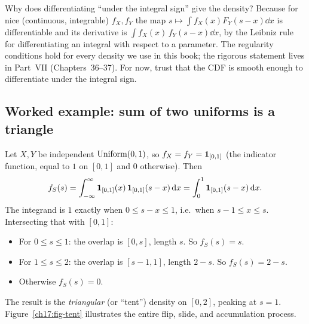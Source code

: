 \begin{whybox}
Why does differentiating ``under the integral sign'' give the density?
Because for nice (continuous, integrable) $f_X,f_Y$ the map
$s\mapsto \int f_X(x)F_Y(s-x)\dd x$ is differentiable and its derivative is
$\int f_X(x)\,f_Y(s-x)\dd x$, by the Leibniz rule for differentiating an
integral with respect to a parameter. The regularity conditions hold for
every density we use in this book; the rigorous statement lives in
Part~VII (Chapters~36--37). For now, trust that the CDF is smooth enough to
differentiate under the integral sign.
\end{whybox}

\subsection{Worked example: sum of two uniforms is a triangle}

Let $X,Y$ be independent $\operatorname{Uniform}(0,1)$, so $f_X=f_Y=\mathbf{1}_{[0,1]}$ (the indicator function, equal to $1$ on $[0,1]$ and $0$ otherwise). Then
\[
f_S(s) = \int_{-\infty}^{\infty} \mathbf{1}_{[0,1]}(x)\,\mathbf{1}_{[0,1]}(s-x)\,\mathrm{d} x
       = \int_0^1 \mathbf{1}_{[0,1]}(s-x)\,\mathrm{d} x.
\]
The integrand is $1$ exactly when $0\le s-x\le 1$, i.e.\ when
$s-1\le x\le s$. Intersecting that with $[0,1]$:
\begin{itemize}
  \item For $0\le s\le 1$: the overlap is $[0,s]$, length $s$. So $f_S(s)=s$.
  \item For $1\le s\le 2$: the overlap is $[s-1,1]$, length $2-s$. So $f_S(s)=2-s$.
  \item Otherwise $f_S(s)=0$.
\end{itemize}
The result is the \emph{triangular} (or ``tent'') density on $[0,2]$,
peaking at $s=1$. Figure~\ref{ch17:fig-tent} illustrates the entire flip, slide, and accumulation process.

